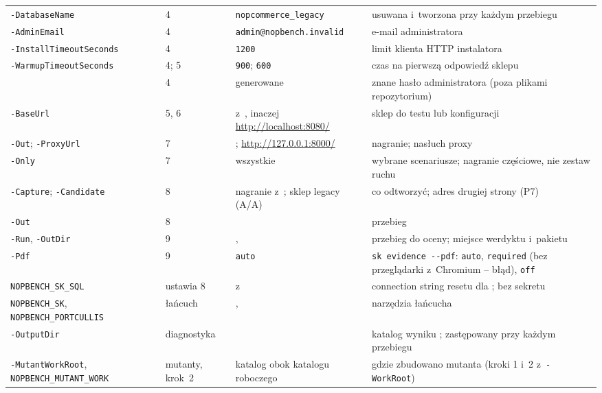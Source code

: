 {\begin{xltabular}{\linewidth}{@{}>{\raggedright\arraybackslash}p{3.9cm} l >{\raggedright\arraybackslash}p{4.1cm} >{\raggedright\arraybackslash}X@{}}
\texttt{-DatabaseName} & 4 & \texttt{nopcommerce\_legacy} & usuwana i~tworzona przy
  każdym przebiegu \\
\texttt{-AdminEmail} & 4 & \texttt{admin@nopbench.invalid} & e-mail administratora \\
\texttt{-Install\-TimeoutSeconds} & 4 & \texttt{1200} & limit klienta HTTP instalatora \\
\texttt{-Warmup\-TimeoutSeconds} & 4; 5 & \texttt{900}; \texttt{600} & czas na pierwszą
  odpowiedź sklepu \\
 & 4 & generowane & znane hasło administratora
  (poza plikami repozytorium) \\
\texttt{-BaseUrl} & 5, 6 & z~, inaczej \url{http://localhost:8080/} &
  sklep do testu lub konfiguracji \\
\texttt{-Out}; \texttt{-ProxyUrl} & 7 & ;
  \url{http://127.0.0.1:8000/} & nagranie; nasłuch proxy \\
\texttt{-Only} & 7 & wszystkie & wybrane scenariusze; nagranie częściowe, nie zestaw ruchu \\
\texttt{-Capture}; \texttt{-Candidate} & 8 & nagranie z~; sklep legacy
  (A/A) & co odtworzyć; adres drugiej strony (P7) \\
\texttt{-Out} & 8 &  & przebieg \\
\texttt{-Run}, \texttt{-OutDir} & 9 & ,  &
  przebieg do oceny; miejsce werdyktu i~pakietu \\
\texttt{-Pdf} & 9 & \texttt{auto} & \texttt{sk evidence -{}-pdf}: \texttt{auto},
  \texttt{required} (bez przeglądarki z~Chromium -- błąd), \texttt{off} \\
\texttt{NOPBENCH\_SK\_SQL} & ustawia 8 & z~ & connection string resetu
  dla ; bez sekretu \\
\texttt{NOPBENCH\_SK}, \texttt{NOPBENCH\_PORTCULLIS} & łańcuch &
  , 
  & narzędzia łańcucha \\
\texttt{-OutputDir} & diagnostyka &  & katalog wyniku
  ; zastępowany przy każdym przebiegu \\
\texttt{-MutantWorkRoot}, \texttt{NOPBENCH\_MUTANT\_WORK} & mutanty, krok~2 & katalog
   obok katalogu roboczego & gdzie zbudowano mutanta (kroki 1 i~2
  z~\texttt{-WorkRoot}) \\
\end{xltabular}
}

